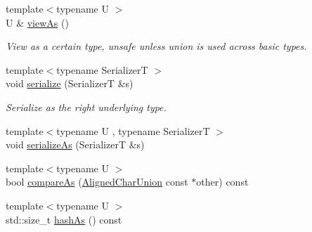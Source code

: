 \begin{DoxyCompactItemize}
{\footnotesize template$<$typename U $>$ }\\U \& \hyperlink{structvt_1_1util_1_1adt_1_1_aligned_char_union_af9bd3e00a355dca08d88103852f716ce}{view\+As} ()
\begin{DoxyCompactList}\small\item\em View as a certain type, unsafe unless union is used across basic types. \end{DoxyCompactList}\item 
{\footnotesize template$<$typename SerializerT $>$ }\\void \hyperlink{structvt_1_1util_1_1adt_1_1_aligned_char_union_a3b7862db1eb10fc16c66aa09a4e3fec6}{serialize} (SerializerT \&s)
\begin{DoxyCompactList}\small\item\em Serialize as the right underlying type. \end{DoxyCompactList}\item 
{\footnotesize template$<$typename U , typename SerializerT $>$ }\\void \hyperlink{structvt_1_1util_1_1adt_1_1_aligned_char_union_a1278b482c837c11fd2f6f41b7f8b0f33}{serialize\+As} (SerializerT \&s)
\item 
{\footnotesize template$<$typename U $>$ }\\bool \hyperlink{structvt_1_1util_1_1adt_1_1_aligned_char_union_ac2ba0a705e45724c9882b904b5c1231b}{compare\+As} (\hyperlink{structvt_1_1util_1_1adt_1_1_aligned_char_union}{Aligned\+Char\+Union} const $\ast$other) const
\item 
{\footnotesize template$<$typename U $>$ }\\std\+::size\+\_\+t \hyperlink{structvt_1_1util_1_1adt_1_1_aligned_char_union_a7c7bfb6979d827a602e4aba1f6886cb8}{hash\+As} () const
\end{DoxyCompactItemize}
